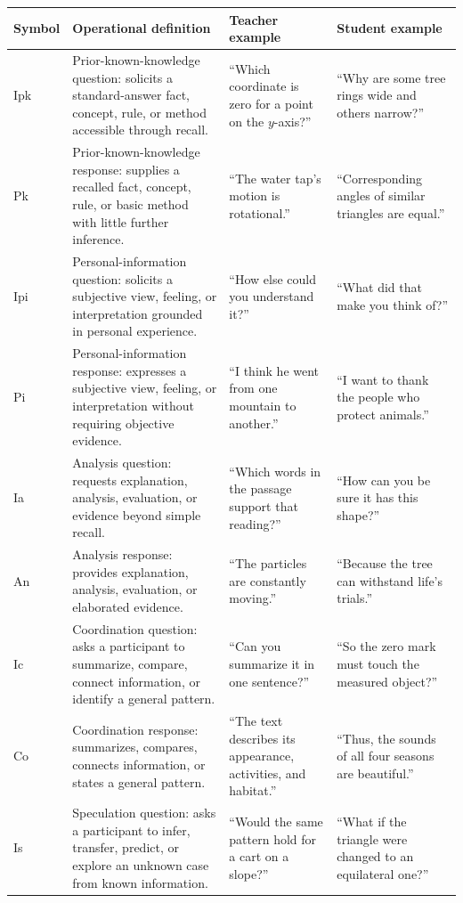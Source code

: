 \documentclass[manuscript,review,anonymous]{acmart}
\begin{document}
\begin{table}[t]
\centering
\scriptsize
\setlength{\tabcolsep}{3.5pt}
\begin{tabularx}{\textwidth}{@{}l>{\raggedright\arraybackslash}p{}>{\raggedright\arraybackslash}p{}>{\raggedright\arraybackslash}X@{}}
\toprule
Symbol & Operational definition & Teacher example & Student example \\
\midrule
Ipk & Prior-known-knowledge question: solicits a standard-answer fact, concept, rule, or method accessible through recall. & ``Which coordinate is zero for a point on the $y$-axis?'' & ``Why are some tree rings wide and others narrow?'' \\
Pk & Prior-known-knowledge response: supplies a recalled fact, concept, rule, or basic method with little further inference. & ``The water tap's motion is rotational.'' & ``Corresponding angles of similar triangles are equal.'' \\
Ipi & Personal-information question: solicits a subjective view, feeling, or interpretation grounded in personal experience. & ``How else could you understand it?'' & ``What did that make you think of?'' \\
Pi & Personal-information response: expresses a subjective view, feeling, or interpretation without requiring objective evidence. & ``I think he went from one mountain to another.'' & ``I want to thank the people who protect animals.'' \\
Ia & Analysis question: requests explanation, analysis, evaluation, or evidence beyond simple recall. & ``Which words in the passage support that reading?'' & ``How can you be sure it has this shape?'' \\
An & Analysis response: provides explanation, analysis, evaluation, or elaborated evidence. & ``The particles are constantly moving.'' & ``Because the tree can withstand life's trials.'' \\
Ic & Coordination question: asks a participant to summarize, compare, connect information, or identify a general pattern. & ``Can you summarize it in one sentence?'' & ``So the zero mark must touch the measured object?'' \\
Co & Coordination response: summarizes, compares, connects information, or states a general pattern. & ``The text describes its appearance, activities, and habitat.'' & ``Thus, the sounds of all four seasons are beautiful.'' \\
Is & Speculation question: asks a participant to infer, transfer, predict, or explore an unknown case from known information. & ``Would the same pattern hold for a cart on a slope?'' & ``What if the triangle were changed to an equilateral one?'' \\

\end{tabularx}
\end{table}
\end{document}

